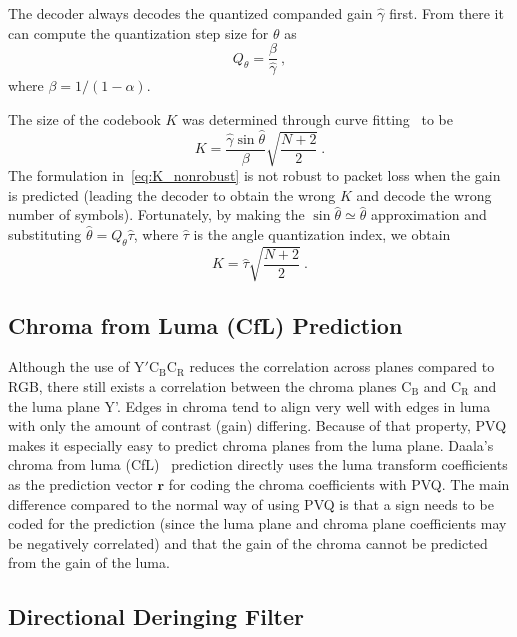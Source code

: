 \documentclass[english,conference,10pt]{IEEEtran}
\begin{document}
The decoder always decodes the quantized companded gain $\hat{\gamma}$
first. From there it can compute the quantization step size for $\theta$ as
\begin{equation}
Q_\theta = \frac{\beta}{\hat{\gamma}}\ ,
\end{equation}
where $\beta = 1/(1-\alpha)$.

The size of the codebook $K$ was determined through curve
fitting~\cite{valin2015spie} to be
\begin{equation}
K = \frac{\hat{\gamma}\sin\hat{\theta}}{\beta}\sqrt{\frac{N+2}{2}}\ .
\label{eq:K_nonrobust}
\end{equation}
The formulation in~\cref{eq:K_nonrobust} is not robust to packet loss when
the gain is predicted (leading the decoder to obtain the wrong $K$ and decode
the wrong number of symbols). Fortunately, by making the $\sin{\hat{\theta}}
\simeq \hat{\theta}$ approximation and substituting $\hat{\theta} =
Q_\theta\hat{\tau}$, where $\hat{\tau}$ is the angle quantization index, we obtain
\begin{equation}
K = \hat{\tau} \sqrt{\frac{N+2}{2}}\ .
\end{equation}


\subsection{Chroma from Luma (CfL) Prediction}

Although the use of $\mathrm{Y'C_BC_R}$ reduces the correlation across planes
compared to RGB, there still exists a correlation between the chroma planes
$\mathrm{C_B}$ and $\mathrm{C_R}$ and the luma plane Y'. Edges in chroma tend to
align very well with edges in luma with only the amount of contrast (gain) differing.
Because of that property, PVQ makes it especially easy to predict
chroma planes from the luma plane. Daala's chroma from luma (CfL)~\cite{egge2015spie}
prediction directly uses the luma transform coefficients as the prediction vector
$\mathbf{r}$ for coding the chroma coefficients with PVQ\@. The main difference compared
to the normal way of using PVQ is that a sign needs to be coded for the prediction
(since the luma plane and chroma plane coefficients may be negatively correlated) and
that the gain of the chroma cannot be predicted from the gain of the luma.


\subsection{Directional Deringing Filter}
\label{sec:deringing}
\end{document}
